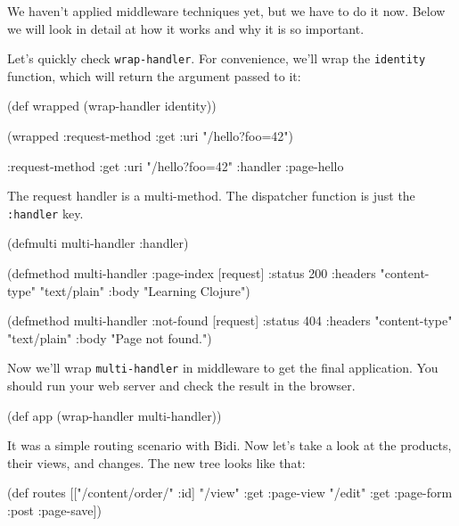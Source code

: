 We haven't applied middleware techniques yet, but we have to do it now. Below we will look in detail at how it works and why it is so important.

Let's quickly check \verb|wrap-handler|. For convenience, we'll wrap the \verb|identity| function, which will return the argument passed to it:

\begin{english}
\begin{clojure}
(def wrapped (wrap-handler identity))

(wrapped {:request-method :get
:uri "/hello?foo=42"})

{:request-method :get
:uri "/hello?foo=42"
:handler :page-hello}
\end{clojure}
\end{english}


The request handler is a multi-method. The dispatcher function is just the \verb|:handler| key.

\begin{english}
\begin{clojure}
(defmulti multi-handler
:handler)

(defmethod multi-handler :page-index
[request]
{:status 200
:headers {"content-type" "text/plain"}
:body "Learning Clojure"})

(defmethod multi-handler :not-found
[request]
{:status 404
:headers {"content-type" "text/plain"}
:body "Page not found."})
\end{clojure}
\end{english}

Now we'll wrap \verb|multi-handler| in middleware to get the final application. You should run your web server and check the result in the browser.

\begin{english}
\begin{clojure}
(def app (wrap-handler multi-handler))
\end{clojure}
\end{english}

It was a simple routing scenario with Bidi. Now let's take a look at the products, their views, and changes. The new tree looks like that:

\begin{english}
\begin{clojure}
(def routes
[["/content/order/" :id] {"/view" {:get  :page-view}
"/edit" {:get  :page-form
:post :page-save}}])
\end{clojure}
\end{english}

